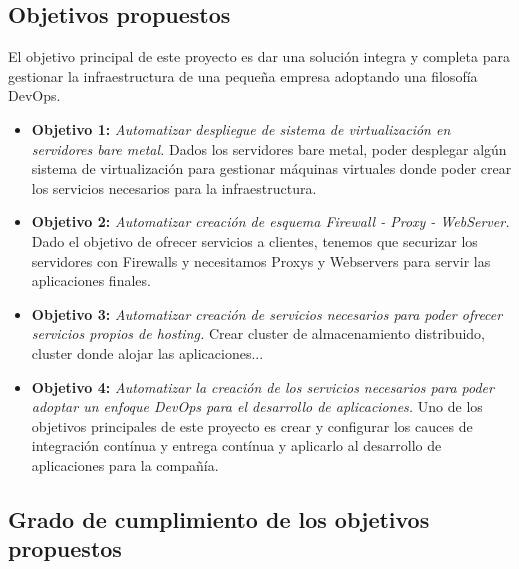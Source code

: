 	\subsection{Objetivos propuestos}
		\label{ObjetivosPropuestos}
		\begin{paragraph}
			El objetivo principal de este proyecto es dar una solución integra y completa para gestionar la infraestructura de una pequeña empresa adoptando una filosofía DevOps.
		\end{paragraph}
		\begin{itemize}
			\item \textbf{Objetivo 1:} \textit{Automatizar despliegue de sistema de virtualización en servidores bare metal.}  Dados los servidores bare metal, poder desplegar algún sistema de virtualización para gestionar máquinas virtuales donde poder crear los servicios necesarios para la infraestructura.
			\item \textbf{Objetivo 2:} \textit{Automatizar creación de esquema Firewall - Proxy - WebServer.}  Dado el objetivo de ofrecer servicios a clientes, tenemos que securizar los servidores con Firewalls y necesitamos Proxys y Webservers para servir las aplicaciones finales. 
			\item \textbf{Objetivo 3:} \textit{Automatizar creación de servicios necesarios para poder ofrecer servicios propios de hosting.} Crear cluster de almacenamiento distribuido, cluster donde alojar las aplicaciones...
			\item \textbf{Objetivo 4:} \textit{Automatizar la creación de los servicios necesarios para poder adoptar un enfoque DevOps para el desarrollo de aplicaciones.} Uno de los objetivos principales de este proyecto es crear y configurar los cauces de integración contínua y entrega contínua y aplicarlo al desarrollo de aplicaciones para la compañía.
		\end{itemize}
 
	\subsection{Grado de cumplimiento de los objetivos propuestos}






